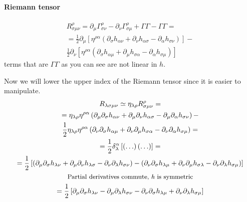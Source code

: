 \paragraph{Riemann tensor}
\begin{align}
	R^{\rho }_{\sigma \mu \nu } = \partial_{\mu }\Gamma ^{\rho }_{\sigma \nu } - \partial_{\nu }\Gamma ^{\rho }_{\sigma \mu } + \Gamma \Gamma -\Gamma \Gamma  = \nonumber\\
				    = \frac{1}{2} \partial_{\mu } \left[ \eta ^{\rho \alpha }\left( \partial_{\sigma} h_{\alpha \nu }+ \partial_{\nu }h_{\alpha \sigma }- \partial_{\alpha }h_{\sigma \nu } \right) \right] - \nonumber\\
				     \frac{1}{2}\partial_{\nu }\left[ \eta ^{\rho \alpha }\left( \partial_{\sigma }h_{\alpha \mu } +\partial_{\mu }h_{\sigma \alpha }- \partial_{\alpha }h_{\sigma \mu } \right) \right] \nonumber
\end{align}
terms that are $\Gamma \Gamma $ as you can see are not linear in $h$.\par
Now we will lower the upper index of the Riemann tensor since it is easier to manipulate.
\begin{gather}
	R_{\lambda \sigma \mu \nu } \simeq \eta _{\lambda \rho }R^{\rho }_{\sigma \mu \nu } = \nonumber \\
	 =  \eta _{\lambda \rho }\eta ^{\rho \alpha } \left( \partial_{\mu }\partial_{\sigma }h _{\alpha \nu } + \partial_{\mu }\partial_{\nu }h_{\alpha \sigma }-\partial_{\mu }\partial_{\alpha }h_{\sigma \nu } \right) - \nonumber\\
	  \frac{1}{2}\eta _{\lambda \rho }\eta ^{\rho \alpha }\left( \partial_{\nu }\partial_{\sigma }h_{\alpha \mu } + \partial_{\nu }\partial_{\mu }h_{\sigma \alpha }-\partial_{\nu }\partial_{\alpha }h_{\sigma \mu } \right) =  \nonumber\\
	  = \frac{1}{2} \delta ^{\alpha }_{\lambda }\left[ \left( \ldots  \right)\left( \ldots  \right) \right] = \nonumber\\
	  = \frac{1}{2} \left[ \left( \partial_{\mu }\partial_{\sigma }h_{\lambda \nu } +\partial_{\mu }\partial_{\nu }h_{\lambda \sigma }-\partial_{\nu }\partial_{\lambda }h_{\sigma \nu } \right) - \left( \partial_{\nu }\partial_{\sigma }h_{\lambda \mu }+ \partial_{\nu }\partial_{\mu }h_{\sigma \lambda } - \partial_{\nu }\partial_{\lambda }h_{\sigma \mu } \right) \right] \nonumber\\
	 \text{ {\small Partial derivatives commute, \emph{h} is symmetric }} \nonumber\\
	 = \frac{1}{2} \left[ \partial_{\mu }\partial_{\sigma }h_{\lambda \nu }-\partial_{\mu }\partial_{\lambda }h_{\sigma \nu } - \partial_{\nu }\partial_{\sigma }h_{\lambda \mu } + \partial_{\nu }\partial_{\lambda }h_{\sigma \mu } \right]
\end{gather}
